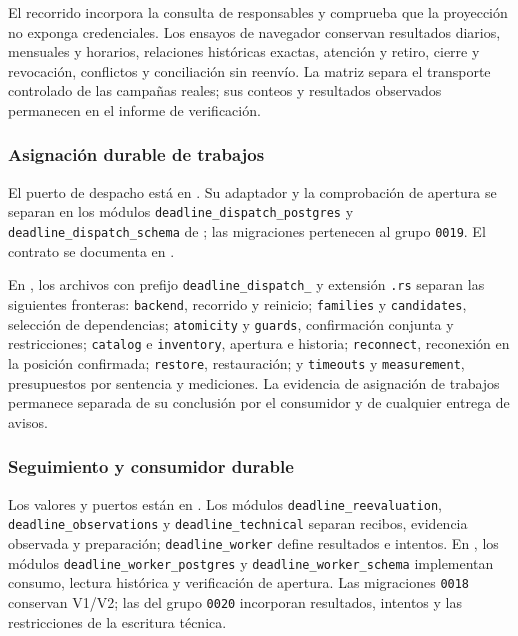 El recorrido  incorpora la consulta de responsables y comprueba que la proyección no exponga credenciales. Los ensayos de navegador conservan resultados diarios, mensuales y horarios, relaciones históricas exactas, atención y retiro, cierre y revocación, conflictos y conciliación sin reenvío. La matriz separa el transporte controlado de las campañas reales; sus conteos y resultados observados permanecen en el informe de verificación.

\subsubsection{Asignación durable de trabajos}

\begingroup
\raggedright
El puerto de despacho está en . Su adaptador y la comprobación de apertura se separan en los módulos \texttt{deadline\_dispatch\_postgres} y \texttt{deadline\_dispatch\_schema} de ; las migraciones pertenecen al grupo \texttt{0019}. El contrato se documenta en .

En , los archivos con prefijo \texttt{deadline\_dispatch\_} y extensión \texttt{.rs} separan las siguientes fronteras: \texttt{backend}, recorrido y reinicio; \texttt{families} y \texttt{candidates}, selección de dependencias; \texttt{atomicity} y \texttt{guards}, confirmación conjunta y restricciones; \texttt{catalog} e \texttt{inventory}, apertura e historia; \texttt{reconnect}, reconexión en la posición confirmada; \texttt{restore}, restauración; y \texttt{timeouts} y \texttt{measurement}, presupuestos por sentencia y mediciones. La evidencia de asignación de trabajos permanece separada de su conclusión por el consumidor y de cualquier entrega de avisos.
\par
\endgroup

\subsubsection{Seguimiento y consumidor durable}

\begingroup
\raggedright
Los valores y puertos están en . Los módulos \texttt{deadline\_reevaluation}, \texttt{deadline\_observations} y \texttt{deadline\_technical} separan recibos, evidencia observada y preparación; \texttt{deadline\_worker} define resultados e intentos. En , los módulos \texttt{deadline\_worker\_postgres} y \texttt{deadline\_worker\_schema} implementan consumo, lectura histórica y verificación de apertura. Las migraciones \texttt{0018} conservan V1/V2; las del grupo \texttt{0020} incorporan resultados, intentos y las restricciones de la escritura técnica.

